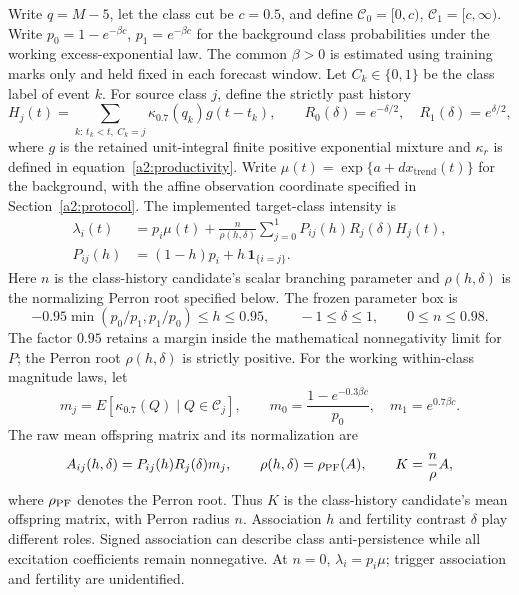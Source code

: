 Write \(q=M-5\), let the class cut be \(c=0.5\), and define
\(\mathcal C_0=[0,c)\), \(\mathcal C_1=[c,\infty)\). Write
\(p_0=1-e^{-\beta c}\), \(p_1=e^{-\beta c}\) for the background class
probabilities under the working excess-exponential law. The common
\(\beta>0\) is estimated using training marks only and held fixed in each
forecast window. Let \(C_k\in\{0,1\}\) be the class label of event \(k\).
For source class \(j\), define the strictly past history
\[
 H_j(t)=\sum_{k:\,t_k<t,\ C_k=j}\kappa_{0.7}(q_k)g(t-t_k),
 \qquad
 R_0(\delta)=e^{-\delta/2},\quad R_1(\delta)=e^{\delta/2},
\]
where \(g\) is the retained unit-integral finite positive exponential
mixture and \(\kappa_r\) is defined in equation~\eqref{a2:productivity}.
Write \(\mu(t)=\exp\{a+d x_{\mathrm{trend}}(t)\}\) for the background, with the affine
observation coordinate specified in Section~\ref{a2:protocol}.
The implemented target-class intensity is
\begin{equation}
 \begin{aligned}
 \lambda_i(t)&=p_i\mu(t)+\frac{n}{\rho(h,\delta)}
       \sum_{j=0}^1 P_{ij}(h)R_j(\delta)H_j(t),\\
 P_{ij}(h)&=(1-h)p_i+h\,\mathbf 1_{\{i=j\}}.
 \end{aligned}
 \label{a2:class-intensity}
\end{equation}
Here \(n\) is the class-history candidate's scalar branching parameter and
\(\rho(h,\delta)\) is the normalizing Perron root specified below.
The frozen parameter box is
\[
 -0.95\min(p_0/p_1,p_1/p_0)\leq h\leq 0.95,\qquad
 -1\leq\delta\leq1,\qquad 0\leq n\leq 0.98.
\]
The factor \(0.95\) retains a margin inside the mathematical
nonnegativity limit for \(P\); the Perron root \(\rho(h,\delta)\) is
strictly positive.
For the working within-class magnitude laws, let
\[
 m_j=E[\kappa_{0.7}(Q)\mid Q\in\mathcal C_j],\qquad
 m_0=\frac{1-e^{-0.3\beta c}}{p_0},\quad m_1=e^{0.7\beta c}.
\]
The raw mean offspring matrix and its normalization are
\[
 A_{ij}(h,\delta)=P_{ij}(h)R_j(\delta)m_j,\qquad
 \rho(h,\delta)=\rho_{\rm PF}(A),\qquad K=\frac{n}{\rho}A,
\]
where \(\rho_{\rm PF}\) denotes the Perron root. Thus \(K\) is the
class-history candidate's mean offspring matrix, with Perron radius \(n\).
Association \(h\) and fertility contrast \(\delta\) play different roles.
Signed association can describe class anti-persistence while all
excitation coefficients remain nonnegative. At \(n=0\),
\(\lambda_i=p_i\mu\); trigger association and fertility are unidentified.

